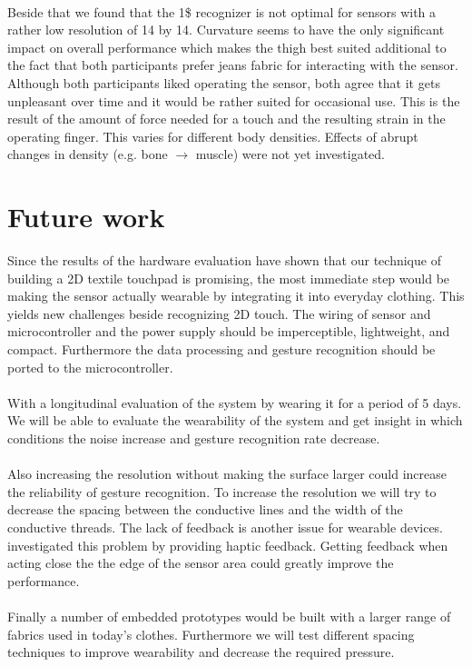 \\
Beside that we found that the 1\$ recognizer is not optimal for sensors with a rather low resolution of 14 by 14. Curvature seems to have the only significant impact on overall performance which makes the thigh best suited additional to the fact that both participants prefer jeans fabric for interacting with the sensor. Although both participants liked operating the sensor, both agree that it gets unpleasant over time and it would be rather suited for occasional use. This is the result of the amount of force needed for a touch and the resulting strain in the operating finger. This varies for different body densities. Effects of abrupt changes in density (e.g. bone $\rightarrow$ muscle) were not yet investigated.

\section{Future work}
\label{summaryandfuturework.futurework}
Since the results of the hardware evaluation have shown that our technique of building a 2D textile touchpad is promising, the most immediate step would  be making the sensor actually wearable by integrating it into everyday clothing. This yields new challenges beside recognizing 2D touch. The wiring of sensor and microcontroller and the power supply should be imperceptible, lightweight, and compact. Furthermore the data processing and gesture recognition should be ported to the microcontroller. 
\\ \\
With a longitudinal evaluation of the system by wearing it for a period of 5 days. We will be able to evaluate the wearability of the system and get insight in which conditions the noise increase and gesture recognition rate decrease.
\\ \\
Also increasing the resolution without making the surface larger could increase the reliability of gesture recognition. To increase the resolution we will try to decrease the spacing between the conductive lines and the width of the conductive threads. The lack of feedback is another issue for wearable devices. \cite{6636291} investigated this problem by providing haptic feedback. Getting feedback when acting close the the edge of the sensor area could greatly improve the performance. 
\\ \\
Finally a number of embedded prototypes would be built with a larger range of fabrics used in today's clothes. Furthermore we will test different spacing techniques to improve wearability and decrease the required pressure. 

